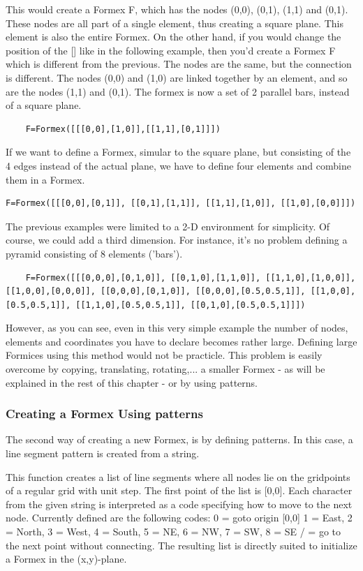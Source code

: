 \documentclass[a4paper]{manual}
\begin{document}
{This would create a Formex F, which has the nodes (0,0), (0,1), (1,1) and (0,1). These nodes are all part of a single element, thus creating a square plane. This element is also the entire Formex.
On the other hand, if you would change the position of the [] %
like in the following example, then you'd create a Formex F which is different from the previous. The nodes are the same, but the connection is different. The nodes (0,0) and (1,0) are linked together by an element, and so are the nodes (1,1) and (0,1). The formex is now a set of 2 parallel bars, instead of a square plane. 
\begin{verbatim}
	F=Formex([[[0,0],[1,0]],[[1,1],[0,1]]])
\end{verbatim}

If we want to define a Formex, simular to the square plane, but consisting of the 4 edges instead of the actual plane, we have to define four elements and combine them in a Formex.
\begin{verbatim}
F=Formex([[[0,0],[0,1]], [[0,1],[1,1]], [[1,1],[1,0]], [[1,0],[0,0]]])
\end{verbatim}

The previous examples were limited to a 2-D environment for simplicity. Of course, we could add a third dimension. For instance, it's no problem defining a pyramid consisting of 8 elements ('bars').
\begin{verbatim}
	F=Formex([[[0,0,0],[0,1,0]], [[0,1,0],[1,1,0]], [[1,1,0],[1,0,0]], [[1,0,0],[0,0,0]], [[0,0,0],[0,1,0]], [[0,0,0],[0.5,0.5,1]], [[1,0,0],[0.5,0.5,1]], [[1,1,0],[0.5,0.5,1]], [[0,1,0],[0.5,0.5,1]]])
\end{verbatim}
However, as you can see, even in this very simple example the number of nodes, elements and coordinates you have to declare becomes rather large. Defining large Formices using this method would not be practicle. This problem is easily overcome by copying, translating, rotating,... a smaller Formex - as will be explained in the rest of this chapter - or by using patterns.
 
\subsubsection{Creating a Formex Using patterns}

The second way of creating a new Formex, is by defining patterns. In this case, a line segment pattern is created from a string.

    This function creates a list of line segments where all nodes lie on the
    gridpoints of a regular grid with unit step.
    The first point of the list is [0,0]. Each character from the given
    string is interpreted as a code specifying how to move to the next node.
    Currently defined are the following codes:
    0 = goto origin [0,0]
    1 = East, 2 = North, 3 = West, 4 = South, 5 = NE, 6 = NW, 7 = SW, 8 = SE
    / = go to the next point without connecting.
    The resulting list is directly suited to initialize a Formex in the
    (x,y)-plane.

}
\end{document}

